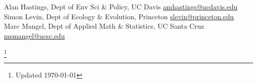 \documentclass[margin]{res}
\begin{document}
\begin{resume}
Alan Hastings, Dept of Env Sci \& Policy, UC Davis \href{mailto:amhastings@ucdavis.edu}{amhastings@ucdavis.edu} \\ 
Simon Levin, Dept of Ecology \& Evolution, Princeton \href{mailto:slevin@princeton.edu}{slevin@princeton.edu} \\
Marc Mangel, Dept of Applied Math \& Statistics, UC Santa Cruz \href{mailto:msmangel@ucsc.edu}{msmangel@ucsc.edu} \\



\end{resume}
\let\thefootnote\relax\footnote{Updated \today}
\end{document}
